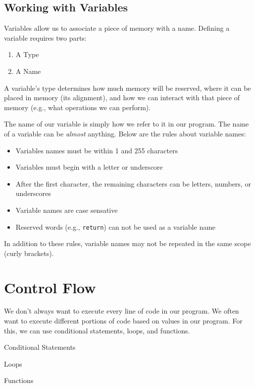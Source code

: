 \documentclass[11pt,fancy,authoryear]{elegantbook}
\begin{document}
\section{Working with Variables}

Variables allow us to associate a piece of memory with a name. Defining a variable requires two parts:

\begin{enumerate}
  \item A Type
  \item A Name
\end{enumerate}

A variable's type determines how much memory will be reserved, where it can be placed in memory (its alignment), and how we can interact with that piece of memory (e.g., what operations we can perform).

The name of our variable is simply how we refer to it in our program. The name of a variable can be \textit{almost} anything. Below are the rules about variable names:

\begin{itemize}
  \item Variables names must be within 1 and 255 characters
  \item Variables must begin with a letter or underscore
  \item After the first character, the remaining characters can be letters, numbers, or underscores
  \item Variable names are case sensative
  \item Reserved words (e.g., \lstinline{return}) can not be used as a variable name
\end{itemize}

In addition to these rules, variable names may not be repeated in the same scope (curly brackets).

\chapter{Control Flow}

We don't always want to execute every line of code in our program. We often want to execute different portions of code based on values in our program. For this, we can use conditional statements, loops, and functions.

\begin{introduction}
  \item Conditional Statements
  \item Loops
  \item Functions
\end{introduction}
\end{document}
